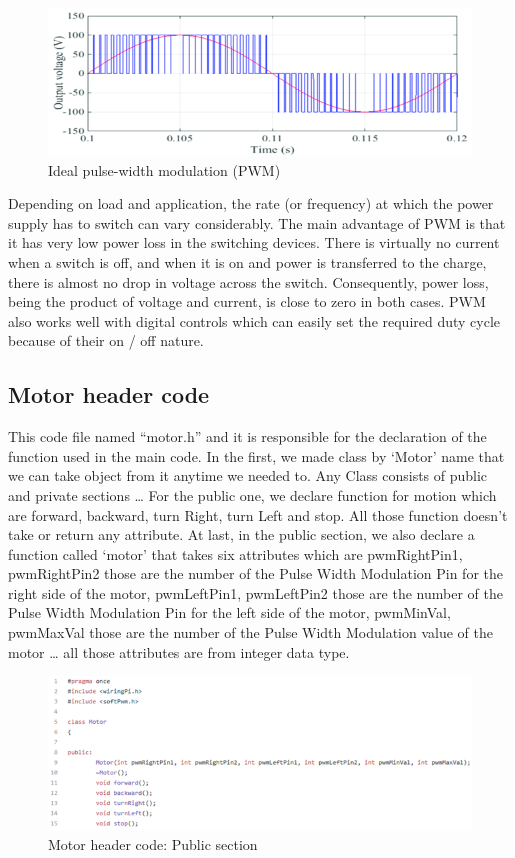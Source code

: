 \documentclass{article}
\begin{document}
\begin{figure}[h]
    \centering
    \includegraphics[width=.8\textwidth]{figures/50.png}
    \caption{Ideal pulse-width modulation (PWM)}
    \label{fig:my_label}
\end{figure}

\newpage

Depending on load and application, the rate (or frequency) at which the power supply has to switch can vary considerably. The main advantage of PWM is that it has very low power loss in the switching devices. There is virtually no current when a switch is off, and when it is on and power is transferred to the charge, there is almost no drop in voltage across the switch. Consequently, power loss, being the product of voltage and current, is close to zero in both cases. PWM also works well with digital controls which can easily set the required duty cycle because of their on / off nature.

\newpage
\subsection{Motor header code}

This code file named “motor.h” and it is responsible for the declaration of the function used in the main code. In the first, we made class by ‘Motor’ name that we can take object from it anytime we needed to. Any Class consists of public and private sections … For the public one, we declare function for motion which are forward, backward, turn Right, turn Left and stop. All those function doesn’t take or return any attribute. At last, in the public section, we also declare a function called ‘motor’ that takes six attributes which are pwmRightPin1, pwmRightPin2 those are the number of the Pulse Width Modulation Pin for the right side of the motor, pwmLeftPin1, pwmLeftPin2 those are the number of the Pulse Width Modulation Pin for the left side of the motor, pwmMinVal, pwmMaxVal those are the number of the Pulse Width Modulation value of the motor … all those attributes are from integer data type.
\newline
\begin{figure}[!h]
    \centering
    \includegraphics{figures/51.png}
    \caption{Motor header code: Public section}
    \label{fig:my_label}
\end{figure}
\end{document}
